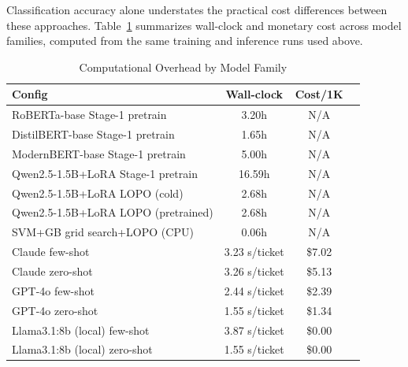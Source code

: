 \documentclass[preprint,12pt]{elsarticle}
\begin{document}
Classification accuracy alone understates the practical cost differences between these approaches. Table~\ref{tab:overhead} summarizes wall-clock and monetary cost across model families, computed from the same training and inference runs used above.

\begin{table}[t]
\centering
\label{tab:overhead}
\footnotesize
\setlength{\tabcolsep}{3pt}
\begin{tabular}{lccc}
\toprule
\textbf{Config} & \textbf{Wall-clock} & \textbf{Cost/1K} \\
\midrule
RoBERTa-base Stage-1 pretrain & 3.20h & N/A \\
DistilBERT-base Stage-1 pretrain & 1.65h & N/A \\
ModernBERT-base Stage-1 pretrain & 5.00h & N/A \\
Qwen2.5-1.5B+LoRA Stage-1 pretrain & 16.59h & N/A \\
Qwen2.5-1.5B+LoRA LOPO (cold) & 2.68h & N/A \\
Qwen2.5-1.5B+LoRA LOPO (pretrained) & 2.68h & N/A \\
SVM+GB grid search+LOPO (CPU) & 0.06h & N/A \\
Claude few-shot & 3.23 s/ticket & \$7.02 \\
Claude zero-shot & 3.26 s/ticket & \$5.13 \\
GPT-4o few-shot & 2.44 s/ticket & \$2.39 \\
GPT-4o zero-shot & 1.55 s/ticket & \$1.34 \\
Llama3.1:8b (local) few-shot & 3.87 s/ticket & \$0.00 \\
Llama3.1:8b (local) zero-shot & 1.55 s/ticket & \$0.00 \\
\bottomrule
\end{tabular}
\begin{flushleft}
\caption{Computational Overhead by Model Family}
\end{flushleft}
\end{table}
\end{document}
